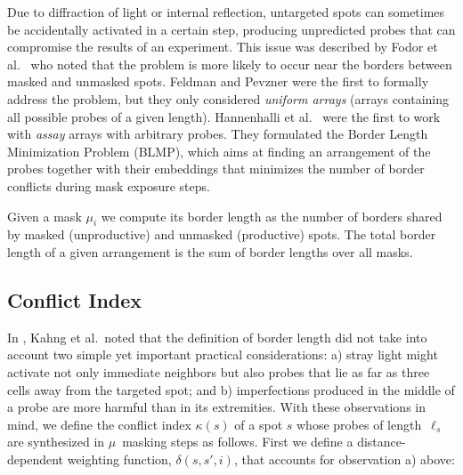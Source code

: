 \documentclass{llncs}
\begin{document}
Due to diffraction of light or internal reflection, untargeted spots can sometimes be accidentally activated in a certain step, producing unpredicted probes that can compromise the results of an experiment. This issue was described by Fodor et al.\ \cite{FODOR91} who noted that the problem is more likely to occur near the borders between masked and unmasked spots. Feldman and Pevzner \cite{FELDMAN93} were the first to formally address the problem, but they only considered \emph{uniform arrays} (arrays containing all possible probes of a given length). Hannenhalli et al.\ \cite{HANNENHALLI02} were the first to work with \emph{assay} arrays with arbitrary probes. They formulated the Border Length Minimization Problem (BLMP), which aims at finding an arrangement of the probes together with their embeddings that minimizes the number of border conflicts during mask exposure steps.

Given a mask $\mu_{i}$ we compute its border length as the number of borders shared by masked (unproductive) and unmasked (productive) spots. The total border length of a given arrangement is the sum of border lengths over all masks.

\subsection{Conflict Index}

In \cite{KAHNG03}, Kahng et al.\ noted that the definition of border length did not take into account two simple yet important practical considerations: a) stray light might activate not only immediate neighbors but also probes that lie as far as three cells away from the targeted spot; and b) imperfections produced in the middle of a probe are more harmful than in its extremities. With these observations in mind, we define the conflict index $\kappa(s)$ of a spot $s$ whose probes of length~$\ell_{s}$ are synthesized in $\mu$~masking steps as follows. First we define a distance-dependent weighting function, $\delta(s,s',i)$, that accounts for observation a) above:
\end{document}
